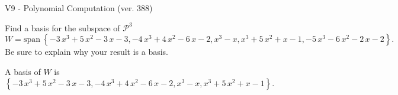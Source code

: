 \begin{exercise}
  \begin{exerciseTitle}V9 - Polynomial Computation (ver. 388)\end{exerciseTitle}
  \begin{exerciseStatement}
    Find a basis for the subspace of \(\mathcal{P}^3\) 
\[W=\mathrm{span}\ \left\{-3 \, x^{3} + 5 \, x^{2} - 3 \, x - 3 , -4 \, x^{3} + 4 \, x^{2} - 6 \, x - 2 , x^{3} - x , x^{3} + 5 \, x^{2} + x - 1 , -5 \, x^{3} - 6 \, x^{2} - 2 \, x - 2\right\}.\]
 Be sure to explain why your result is a basis.


  \end{exerciseStatement}
  \begin{exerciseAnswer}
   A basis of \(W\) is  \(\left\{-3 \, x^{3} + 5 \, x^{2} - 3 \, x - 3 , -4 \, x^{3} + 4 \, x^{2} - 6 \, x - 2 , x^{3} - x , x^{3} + 5 \, x^{2} + x - 1\right\}\).
  


  \end{exerciseAnswer}
\end{exercise}